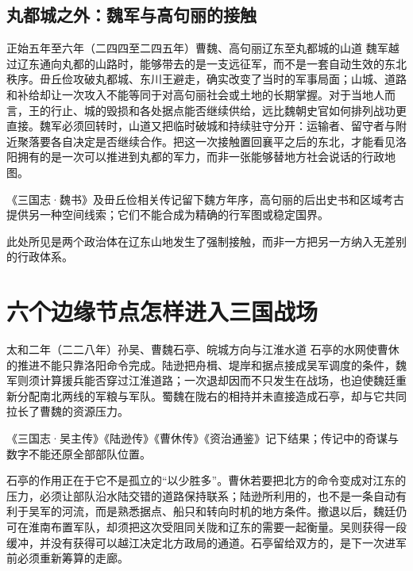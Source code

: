 \subsection{丸都城之外：魏军与高句丽的接触}
\begin{event}{}{正始五年至六年（二四四至二四五年）}{曹魏、高句丽}{辽东至丸都城的山道}
魏军越过辽东通向丸都的山路时，能够带去的是一支远征军，而不是一套自动生效的东北秩序。毌丘俭攻破丸都城、东川王避走，确实改变了当时的军事局面；山城、道路和补给却让一次攻入不能等同于对高句丽社会或土地的长期掌握。对于当地人而言，王的行止、城的毁损和各处据点能否继续供给，远比魏朝史官如何排列战功更直接。魏军必须回转时，山道又把临时破城和持续驻守分开：运输者、留守者与附近聚落要各自决定是否继续合作。把这一次接触置回襄平之后的东北，才能看见洛阳拥有的是一次可以推进到丸都的军力，而非一张能够替地方社会说话的行政地图。

\begin{sourcenote}[丸都一役不是一条固定的东北国界]
《三国志·魏书》及毌丘俭相关传记留下魏方年序，高句丽的后出史书和区域考古提供另一种空间线索；它们不能合成为精确的行军图或稳定国界。
\end{sourcenote}
此处所见是两个政治体在辽东山地发生了强制接触，而非一方把另一方纳入无差别的行政体系。
\end{event}

\section{六个边缘节点怎样进入三国战场}
\begin{event}{}{太和二年（二二八年）}{孙吴、曹魏}{石亭、皖城方向与江淮水道}
石亭的水网使曹休的推进不能只靠洛阳命令完成。陆逊把舟楫、堤岸和据点接成吴军调度的条件，魏军则须计算援兵能否穿过江淮道路；一次退却因而不只发生在战场，也迫使魏廷重新分配南北两线的军粮与军队。蜀魏在陇右的相持并未直接造成石亭，却与它共同拉长了曹魏的资源压力。

\begin{sourcenote}[石亭的奇谋与数字不能还原全部部队位置]
《三国志·吴主传》《陆逊传》《曹休传》《资治通鉴》记下结果；传记中的奇谋与数字不能还原全部部队位置。
\end{sourcenote}

石亭的作用正在于它不是孤立的“以少胜多”。曹休若要把北方的命令变成对江东的压力，必须让部队沿水陆交错的道路保持联系；陆逊所利用的，也不是一条自动有利于吴军的河流，而是熟悉据点、船只和转向时机的地方条件。撤退以后，魏廷仍可在淮南布置军队，却须把这次受阻同关陇和辽东的需要一起衡量。吴则获得一段缓冲，并没有获得可以越江决定北方政局的通道。石亭留给双方的，是下一次进军前必须重新筹算的走廊。
\end{event}

